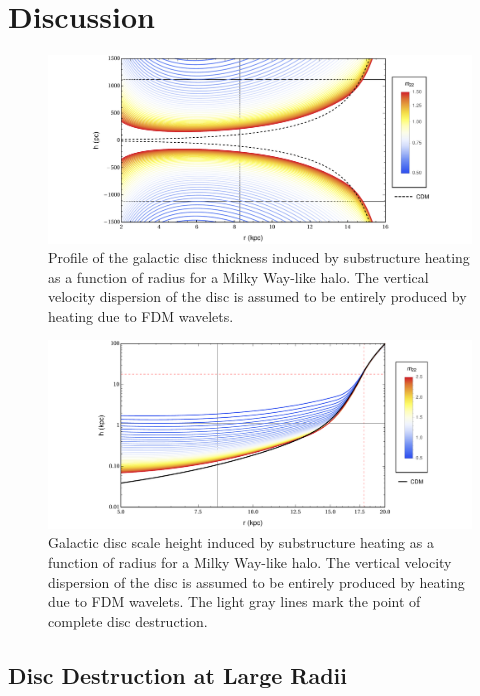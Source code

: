 \documentclass[usenatbib]{mnras}
\begin{document}
\section{Discussion}

\begin{figure}
\includegraphics[width=18cm]{disk_shape}
\vspace*{-5mm}
\caption{Profile of the galactic disc thickness induced by substructure heating as a function of radius for a Milky Way-like halo. The vertical velocity dispersion of the disc is assumed to be entirely produced by heating due to FDM wavelets. }
\label{fig:disc_shape_FDM}
\end{figure}

\begin{figure}
\includegraphics[width=18cm]{disk_scale_height}
\vspace*{-5mm}
\caption{Galactic disc scale height induced by substructure heating as a function of radius for a Milky Way-like halo. The vertical velocity dispersion of the disc is assumed to be entirely produced by heating due to FDM wavelets. The light gray lines mark the point of complete disc destruction. }
\label{fig:disc_scale_height}
\end{figure}

\subsection{Disc Destruction at Large Radii}
\end{document}
